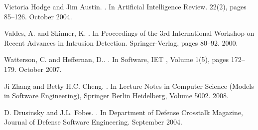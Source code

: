 \documentclass[conference]{IEEEtran}
\begin{document}
\begin{thebibliography}{1}
{Victoria Hodge and Jim Austin}.
.
\newblock In {Artificial Intelligence Review. 22(2), pages 85--126}. October 2004.

{Valdes, A. and Skinner, K}.
.
\newblock In {Proceedings of the 3rd International Workshop on Recent Advances in Intrusion Detection. Springer-Verlag, pages 80--92}. 2000.

{Watterson, C. and Heffernan, D.}.
.
\newblock In {Software, IET , Volume 1(5), pages 172--179}. October 2007.

{Ji Zhang and Betty H.C. Cheng}.
.
\newblock In {Lecture Notes in Computer Science (Models in Software Engineering), Springer Berlin Heidelberg, Volume 5002}. 2008.


{D. Drusinsky and J.L. Fobes}.
.
\newblock In {Department of Defense Crosstalk Magazine, Journal of Defense Software Engineering}. September 2004.






\end{thebibliography}
\end{document}
